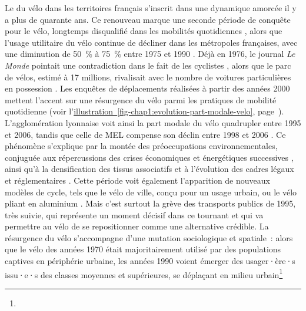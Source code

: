 \begin{refsegment}
Le  du vélo dans les territoires français \textcolor{blue}{\autocites[137-168]{heran_retour_2015}[44]{eskenazi_voir_2022}} s’inscrit dans une dynamique amorcée il y a plus de quarante ans. Ce renouveau marque une seconde période de conquête pour le vélo, longtemps disqualifié dans les mobilités quotidiennes \textcolor{blue}{\autocite[26]{papon_retour_2012}}, alors que l’usage utilitaire du vélo continue de décliner dans les métropoles françaises, avec une diminution de 50~\% à 75~\% entre 1975 et 1990 \textcolor{blue}{\autocite[48]{certu_usagers_2013}}. Déjà en 1976, le journal \textsl{Le Monde} pointait une contradiction dans le fait de  les cyclistes , alors que le parc de vélos, estimé à 17 millions, rivalisait avec le nombre de voitures particulières en possession \textcolor{blue}{\autocite{ambroise-rendu_creation_1976}}. Les enquêtes de déplacements réalisées à partir des années 2000 mettent l'accent sur une résurgence du vélo parmi les pratiques de mobilité quotidienne (voir l'\hyperref[fig-chap1:evolution-part-modale-velo]{illustration~\ref{fig-chap1:evolution-part-modale-velo}}, page~\pageref{fig-chap1:evolution-part-modale-velo}). L’agglomération lyonnaise voit ainsi la part modale du vélo quadrupler entre 1995 et 2006, tandis que celle de \acrfull{MEL} compense son déclin entre 1998 et 2006 \textcolor{blue}{\autocite[243]{dauncey_french_2012}}. Ce phénomène s’explique par la montée des préoccupations environnementales, conjuguée aux répercussions des crises économiques et énergétiques successives \textcolor{blue}{\autocite[138]{heran_retour_2015}}, ainsi qu’à la densification des tissus associatifs et à l’évolution des cadres légaux et réglementaires \textcolor{blue}{\autocite[55]{sebban_complementarite_2003}}. Cette période voit également l’apparition de nouveaux modèles de cycle, tels que le vélo de ville, conçu pour un usage urbain, ou le vélo pliant en aluminium  \textcolor{blue}{\autocite[55]{sebban_complementarite_2003}}. Mais c'est surtout la grève des transports publics de 1995, très suivie, qui représente un moment décisif dans ce tournant et qui va permettre au vélo de se repositionner comme une alternative crédible. La résurgence du vélo s’accompagne d’une mutation sociologique et spatiale~: alors que le vélo des années 1970 était majoritairement utilisé par des populations captives en périphérie urbaine, les années 1990 voient émerger des usager·ère·s issu·e·s des classes moyennes et supérieures, se déplaçant en milieu urbain\footnote{
}
\end{refsegment}
